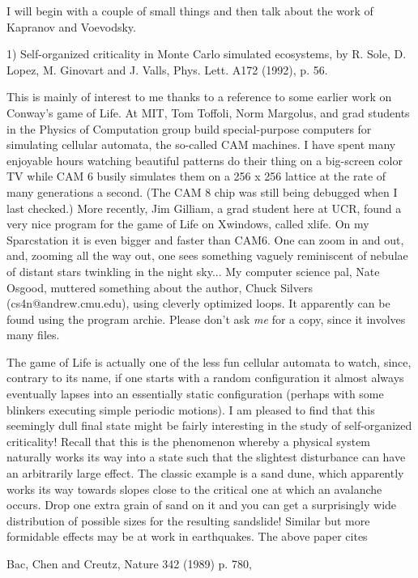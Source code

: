 
I will begin with a couple of small things and then talk about
the work of Kapranov and Voevodsky.

1)  Self-organized criticality in Monte Carlo simulated ecosystems, by
R. Sole, D. Lopez, M. Ginovart and J. Valls, Phys. Lett. A172 (1992), p. 56. 

This is mainly of interest to me thanks to a reference to some earlier work
on Conway's game of Life.  At MIT, Tom Toffoli, Norm Margolus, and grad
students in the Physics of Computation group build special-purpose
computers for simulating cellular automata, the so-called CAM machines.
I have spent many enjoyable hours watching beautiful patterns do their
thing on a big-screen color TV while CAM 6 busily simulates them on a
256 x 256 lattice at the rate of many generations a second.  (The CAM 8
chip was still being debugged when I last checked.)     More recently,
Jim Gilliam, a grad student here at UCR, found a very nice program for the
game of Life on Xwindows, called xlife.  On my Sparcstation it is even
bigger and faster than CAM6.  One can zoom in and out, and, zooming all
the way out, one sees something vaguely reminiscent of nebulae of
distant stars twinkling in the night sky...  My computer science pal,
Nate Osgood, muttered something about the author, Chuck Silvers
(cs4n@andrew.cmu.edu), using cleverly optimized loops.  It apparently
can be found using the program archie.  Please don't ask \emph{me} for a copy,
since it involves many files.  

The game of Life is actually one of the less fun cellular automata
to watch, since, contrary to its name, if one starts with a random
configuration it almost always eventually lapses into an essentially
static configuration (perhaps with some blinkers executing simple
periodic motions).   I am pleased to find that this seemingly dull final
state might be fairly interesting in the study  of self-organized
criticality!  Recall that this is the phenomenon whereby a physical
system naturally works its way into a state such that the slightest
disturbance can have an arbitrarily large effect.  The classic example
is a sand dune, which apparently works its way towards slopes close to
the critical one at which an avalanche occurs.  Drop one extra grain of
sand on it and you can get a surprisingly wide distribution of possible
sizes for the resulting sandslide!  Similar but more formidable effects
may be at work in earthquakes.   The above paper cites

Bac, Chen and Creutz, Nature 342 (1989) p. 780,

